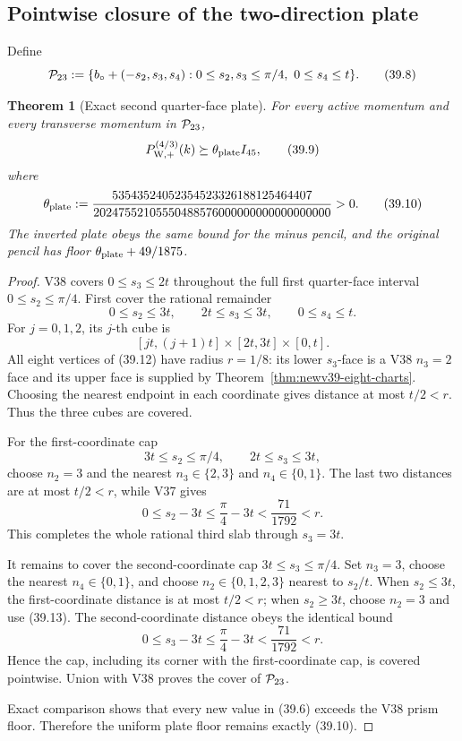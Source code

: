 \documentclass[11pt,oneside]{article}
\newtheorem{theorem}{Theorem}[section]
\theoremstyle{definition}
\theoremstyle{remark}
\begin{document}
\subsection{Pointwise closure of the two-direction plate}

Define
\[
 {\cal P}_{23}:=
 \{b_\circ+(-s_2,s_3,s_4):
 0\le s_2,s_3\le\pi/4,\ 0\le s_4\le t\}.              \tag{39.8}
\]

\begin{theorem}[Exact second quarter-face plate]
\label{thm:newv39-quarter-plate}
For every active momentum and every transverse momentum in
\({\cal P}_{23}\),
\[
 P_{\mathrm W,+}^{(4/3)}(k)
 \succeq\theta_{\rm plate}I_{45},                     \tag{39.9}
\]
where
\[
 \theta_{\rm plate}:=
\frac{53543524052354523326188125464407}
{20247552105550488576000000000000000000}>0.           \tag{39.10}
\]
The inverted plate obeys the same bound for the minus pencil, and
the original pencil has floor
\(\theta_{\rm plate}+49/1875\).
\end{theorem}

\begin{proof}
V38 covers \(0\le s_3\le2t\) throughout the full first
quarter-face interval \(0\le s_2\le\pi/4\).  First cover the
rational remainder
\[
 0\le s_2\le3t,\qquad2t\le s_3\le3t,\qquad
 0\le s_4\le t.                                       \tag{39.11}
\]
For \(j=0,1,2\), its \(j\)-th cube is
\[
 [jt,(j+1)t]\times[2t,3t]\times[0,t].                 \tag{39.12}
\]
All eight vertices of (39.12) have radius \(r=1/8\): its lower
\(s_3\)-face is a V38 \(n_3=2\) face and its upper face is supplied
by Theorem~\ref{thm:newv39-eight-charts}.  Choosing the nearest
endpoint in each coordinate gives distance at most \(t/2<r\).
Thus the three cubes are covered.

For the first-coordinate cap
\[
 3t\le s_2\le\pi/4,\qquad2t\le s_3\le3t,
\]
choose \(n_2=3\) and the nearest \(n_3\in\{2,3\}\) and
\(n_4\in\{0,1\}\).  The last two distances are at most \(t/2<r\),
while V37 gives
\[
 0\le s_2-3t\le\frac{\pi}{4}-3t
 <\frac{71}{1792}<r.                                  \tag{39.13}
\]
This completes the whole rational third slab through \(s_3=3t\).

It remains to cover the second-coordinate cap
\(3t\le s_3\le\pi/4\).  Set \(n_3=3\), choose the nearest
\(n_4\in\{0,1\}\), and choose \(n_2\in\{0,1,2,3\}\) nearest to
\(s_2/t\).  When \(s_2\le3t\), the first-coordinate distance is at
most \(t/2<r\); when \(s_2\ge3t\), choose \(n_2=3\) and use
(39.13).  The second-coordinate distance obeys the identical bound
\[
 0\le s_3-3t\le\frac{\pi}{4}-3t
 <\frac{71}{1792}<r.                                  \tag{39.14}
\]
Hence the cap, including its corner with the first-coordinate cap,
is covered pointwise.  Union with V38 proves the cover of
\({\cal P}_{23}\).

Exact comparison shows that every new value in (39.6) exceeds the
V38 prism floor.  Therefore the uniform plate floor remains exactly
(39.10).
\end{proof}
\end{document}
